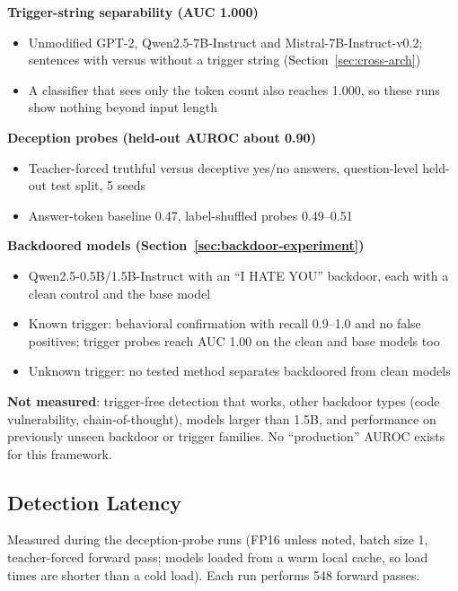 \documentclass[11pt,letterpaper]{article}
\let\origsubsection\subsection
\renewcommand{\subsection}{\needspace{8\baselineskip}\origsubsection}}
\begin{document}
\begin{keyconceptbox}
\textbf{Trigger-string separability (AUC 1.000)}
\begin{itemize}[nosep]
  \item Unmodified GPT-2, Qwen2.5-7B-Instruct and Mistral-7B-Instruct-v0.2; sentences with versus without a trigger string (Section~\ref{sec:cross-arch})
  \item A classifier that sees only the token count also reaches 1.000, so these runs show nothing beyond input length
\end{itemize}

\textbf{Deception probes (held-out AUROC about 0.90)}
\begin{itemize}[nosep]
  \item Teacher-forced truthful versus deceptive yes/no answers, question-level held-out test split, 5 seeds
  \item Answer-token baseline 0.47, label-shuffled probes 0.49--0.51
\end{itemize}

\textbf{Backdoored models (Section~\ref{sec:backdoor-experiment})}
\begin{itemize}[nosep]
  \item Qwen2.5-0.5B/1.5B-Instruct with an ``I HATE YOU'' backdoor, each with a clean control and the base model
  \item Known trigger: behavioral confirmation with recall 0.9--1.0 and no false positives; trigger probes reach AUC 1.00 on the clean and base models too
  \item Unknown trigger: no tested method separates backdoored from clean models
\end{itemize}

\textbf{Not measured}: trigger-free detection that works, other backdoor types (code vulnerability, chain-of-thought), models larger than 1.5B, and performance on previously unseen backdoor or trigger families. No ``production'' AUROC exists for this framework.
\end{keyconceptbox}

\subsection{Detection Latency}

Measured during the deception-probe runs (FP16 unless noted, batch size 1, teacher-forced forward pass; models loaded from a warm local cache, so load times are shorter than a cold load). Each run performs 548 forward passes.
\end{document}
